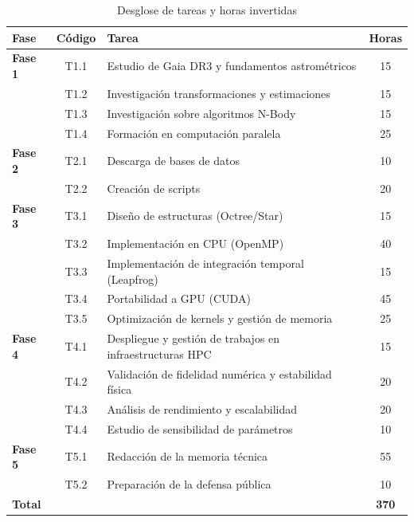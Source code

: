 \begin{table}[ht!]
    \centering
    \setlength{\tabcolsep}{5pt}
    \small
    \begin{tabularx}{\textwidth}{|l|c|X|c|}
        \hline
        \textbf{Fase} & \textbf{Código} & \textbf{Tarea} & \textbf{Horas} \\ \hline
        \textbf{Fase 1} & T1.1 & Estudio de Gaia DR3 y fundamentos astrométricos & 15 \\
        & T1.2 & Investigación transformaciones y estimaciones & 15 \\
        & T1.3 & Investigación sobre algoritmos N-Body & 15 \\
        & T1.4 & Formación en computación paralela & 25 \\ \hline
        \textbf{Fase 2} & T2.1 & Descarga de bases de datos & 10 \\
        & T2.2 & Creación de scripts & 20 \\ \hline
        \textbf{Fase 3} & T3.1 & Diseño de estructuras (Octree/Star) & 15 \\
        & T3.2 & Implementación en CPU (OpenMP) & 40 \\
        & T3.3 & Implementación de integración temporal (Leapfrog) & 15 \\
        & T3.4 & Portabilidad a GPU (CUDA) & 45 \\
        & T3.5 & Optimización de kernels y gestión de memoria & 25 \\ \hline
        \textbf{Fase 4} & T4.1 & Despliegue y gestión de trabajos en infraestructuras HPC & 15 \\
        & T4.2 & Validación de fidelidad numérica y estabilidad física & 20 \\
        & T4.3 & Análisis de rendimiento y escalabilidad & 20 \\
        & T4.4 & Estudio de sensibilidad de parámetros & 10 \\ \hline
        \textbf{Fase 5} & T5.1 & Redacción de la memoria técnica & 55 \\
        & T5.2 & Preparación de la defensa pública & 10 \\ \hline
        \multicolumn{2}{|l|}{\textbf{Total}} & & \textbf{370} \\ \hline
    \end{tabularx}
    \caption{Desglose de tareas y horas invertidas}
    \label{tab:tareas}
\end{table}


